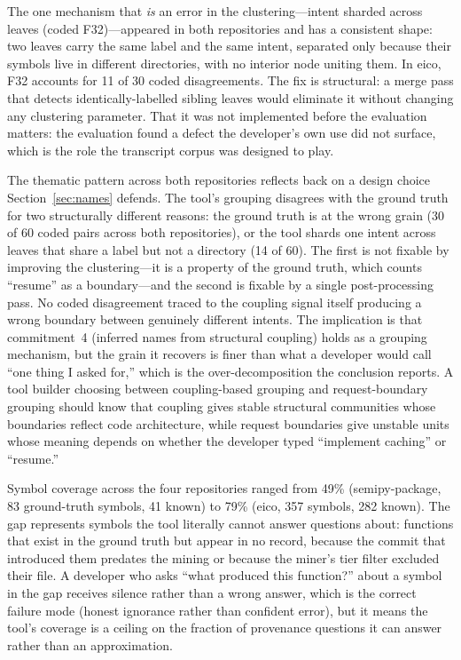 The one mechanism that \emph{is} an error in the clustering---intent sharded
across leaves (coded F32)---appeared in both repositories and has a consistent
shape: two leaves carry the same label and the same intent, separated only
because their symbols live in different directories, with no interior node
uniting them. In eico, F32 accounts for 11 of 30 coded disagreements. The
fix is structural: a merge pass that detects identically-labelled sibling
leaves would eliminate it without changing any clustering parameter. That it
was not implemented before the evaluation matters: the evaluation found a
defect the developer's own use did not surface, which is the role
the transcript corpus was designed to play.

The thematic pattern across both repositories reflects back on a design choice
Section~\ref{sec:names} defends. The tool's grouping disagrees with the ground
truth for two structurally different reasons: the ground truth is at the wrong
grain (30 of 60 coded pairs across both repositories), or the tool shards one
intent across leaves that share a label but not a directory (14 of 60). The
first is not fixable by improving the clustering---it is a property of the
ground truth, which counts ``resume'' as a boundary---and the second is fixable
by a single post-processing pass. No coded disagreement traced to the coupling
signal itself producing a wrong boundary between genuinely different intents.
The implication is that commitment~4 (inferred names from structural coupling)
holds as a grouping mechanism, but the grain it recovers is finer than what a
developer would call ``one thing I asked for,'' which is the over-decomposition
the conclusion reports. A tool builder choosing between coupling-based grouping
and request-boundary grouping should know that coupling gives stable structural
communities whose boundaries reflect code architecture, while request boundaries
give unstable units whose meaning depends on whether the developer typed
``implement caching'' or ``resume.''

Symbol coverage across the four repositories ranged from 49\% (semipy-package,
83 ground-truth symbols, 41 known) to 79\% (eico, 357 symbols, 282 known).
The gap represents symbols the tool literally cannot answer questions about:
functions that exist in the ground truth but appear in no \sgt{} record,
because the commit that introduced them predates the mining or because the
miner's tier filter excluded their file. A developer who asks ``what produced
this function?'' about a symbol in the gap receives silence rather than a wrong
answer, which is the correct failure mode (honest ignorance rather than
confident error), but it means the tool's coverage is a ceiling on the
fraction of provenance questions it can answer rather than an approximation.

